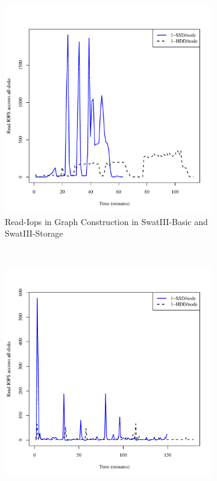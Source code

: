 \documentclass[conference]{IEEEtran}
\begin{document}
\begin{figure}[H]
        \centering
        \begin{subfigure}[b]{0.2\textwidth}
                \includegraphics[width=\textwidth]{Figure/SystemData/Plots/BGHddSsdRdIops.pdf}
                \caption{Read-Iops in Graph Construction in SwatIII-Basic and SwatIII-Storage}
                \label{fig:BGHddSsdRdIops}
        \end{subfigure}
        ~ %
        \begin{subfigure}[b]{0.2\textwidth}
                \includegraphics[width=\textwidth]{Figure/SystemData/Plots/ECHddSsdRdIops.pdf}

\end{subfigure}
\end{figure}
\end{document}
